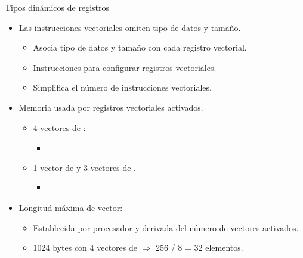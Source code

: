 \begin{frame}[t]{Tipos dinámicos de registros}
\begin{itemize}
  \item Las instrucciones vectoriales omiten tipo de datos y tamaño.
    \begin{itemize}
      \item Asocia tipo de datos y tamaño con cada registro vectorial.
      \item Instrucciones para configurar registros vectoriales.
      \item Simplifica el número de instrucciones vectoriales.
    \end{itemize}

  \item Memoria usada por registros vectoriales activados.
    \begin{itemize}
      \item 4 vectores de :
        \begin{itemize}
          \item {}  
        \end{itemize}
      \item 1 vector de  y 3 vectores de .
        \begin{itemize}
          \item {} 
        \end{itemize}
    \end{itemize}

  \item Longitud máxima de vector:
    \begin{itemize}
      \item Establecida por procesador y derivada del número de vectores activados.
      \item 1024 bytes con 4 vectores de  $\Rightarrow$ 
            256 / 8 = 32 elementos.
    \end{itemize}
\end{itemize}
\end{frame}

